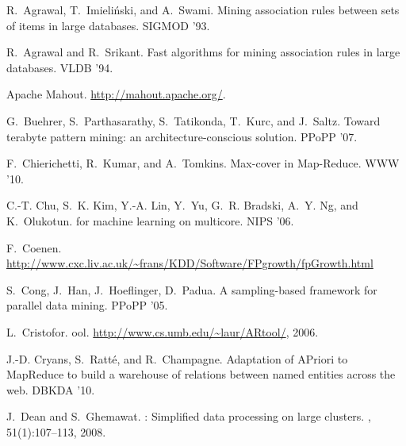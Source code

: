 







%
% 
\iffalse
\begin{thebibliography}{10}
\begin{small}

\vspace{7pt}
R.~Agrawal, T.~Imieli\'{n}ski, and A.~Swami.
\newblock Mining association rules between sets of items in large databases.
\newblock SIGMOD '93.

R.~Agrawal and R.~Srikant.
\newblock Fast algorithms for mining association rules in large databases.
\newblock VLDB '94.

{Apache Mahout}.
\newblock \url{http://mahout.apache.org/}.

G.~Buehrer, S.~Parthasarathy, S.~Tatikonda, T.~Kurc, and J.~Saltz.
\newblock Toward terabyte pattern mining: an architecture-conscious solution.
\newblock PPoPP '07.

F.~Chierichetti, R.~Kumar, and A.~Tomkins.
\newblock Max-cover in {Map-Reduce}.
\newblock WWW '10.

C.-T. Chu, S.~K. Kim, Y.-A. Lin, Y.~Yu, G.~R. Bradski, A.~Y. Ng, and
  K.~Olukotun.
 for machine learning on multicore.
\newblock NIPS '06.

F.~Coenen.
\newblock
\url{http://www.cxc.liv.ac.uk/~frans/KDD/Software/FPgrowth/fpGrowth.html}

S.~Cong, J.~Han, J.~Hoeflinger, D.~Padua.
\newblock A sampling-based framework for parallel data mining.
\newblock PPoPP '05.

L.~Cristofor.
ool.
\newblock \url{http://www.cs.umb.edu/~laur/ARtool/}, 2006.

J.-D. Cryans, S.~Ratt{\'e}, and R.~Champagne.
\newblock Adaptation of {APriori} to {MapReduce} to build a warehouse of
  relations between named entities across the web.
\newblock DBKDA '10.

J.~Dean and S.~Ghemawat.
: Simplified data processing on large clusters.
, 51(1):107--113, 2008.


\end{small}
\end{thebibliography}
